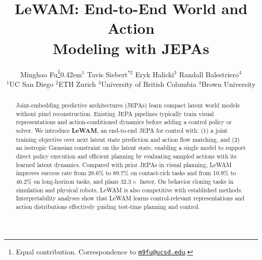 \documentclass{article} %
\title{LeWAM: End-to-End World and Action \\Modeling with JEPAs}
\author{%
Minghao Fu\thanks{Equal contribution. Correspondence to \href{mailto:m9fu@ucsd.edu}{\texttt{m9fu@ucsd.edu}}.}\kern0.42em$^{1}$\quad
Tavis Siebert$^{*2}$\quad
Eryk Halicki$^{3}$\quad
Randall Balestriero$^{4}$\\[-0.1ex]
{\normalfont\small
$^{1}$UC San Diego\quad
$^{2}$ETH Zurich\quad
$^{3}$University of British Columbia\quad
$^{4}$Brown University
}
}
\newcommand{\methodname}[1]{\textup{#1}}
\newcommand{\method}{\methodname{LeWAM}}
\newcommand{\methodintro}{\textbf{\textup{LeWAM}}}
\newcommand{\projectbutton}[3]{%
  \href{#1}{%
    \tcbox[on line, colback=LeWAMStateWash, colframe=LeWAMStateWash, coltext=MethodLeWAM,
           boxrule=0.4pt, arc=4pt, boxsep=2pt,
           left=4pt, right=4pt, top=2pt, bottom=2pt]{%
      \sffamily\mdseries\upshape\small #2\enspace #3}}%
}
\begin{document}
\maketitle
\vspace{-0.30in}
{\centering
\projectbutton{https://le-wam.github.io/}{\faGlobe}{Website}\hspace{0.5em}%
\projectbutton{https://github.com/MinghaoFu/lewam}{\faGithub}{Code}\par}
\vspace{3pt}

\begin{abstract}
Joint-embedding predictive architectures (JEPAs) learn compact latent world models without pixel reconstruction. Existing JEPA pipelines typically train visual representations and action-conditioned dynamics before adding a control policy or solver. We introduce \methodintro{}, an end-to-end JEPA for control with: (1) a joint training objective over next latent state prediction and action flow matching, and (2) an isotropic Gaussian constraint on the latent state, enabling a single model to support direct policy execution and efficient planning by evaluating sampled actions with its learned latent dynamics. Compared with prior JEPAs in visual planning, LeWAM improves success rate from 28.6\% to 89.7\% on contact-rich tasks and from 10.9\% to 46.2\% on long-horizon tasks, and plans $32.3\times$ faster. On behavior cloning tasks in simulation and physical robots, LeWAM is also competitive with established methods. Interpretability analyses show that LeWAM learns control-relevant representations and action distributions effectively guiding test-time planning and control.
\end{abstract}\vspace{-6.5pt}
\end{document}
